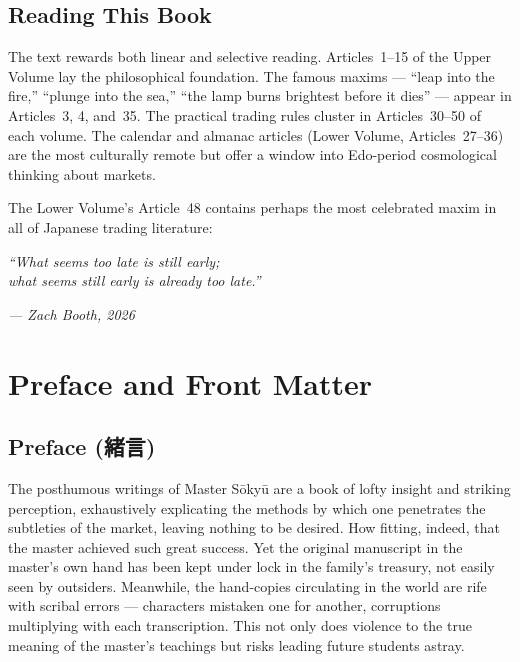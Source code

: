 \documentclass[10pt, openany]{book}
\newcommand{\jp}[1]{{\japanesefont #1}}
\begin{document}
\section*{Reading This Book}

The text rewards both linear and selective reading. Articles~1--15 of
the Upper Volume lay the philosophical foundation. The famous maxims
--- ``leap into the fire,'' ``plunge into the sea,'' ``the lamp burns
brightest before it dies'' --- appear in Articles~3, 4, and~35.
The practical trading rules cluster in Articles~30--50 of each volume.
The calendar and almanac articles (Lower Volume, Articles~27--36) are
the most culturally remote but offer a window into Edo-period
cosmological thinking about markets.

The Lower Volume's Article~48 contains perhaps the most celebrated
maxim in all of Japanese trading literature:

\begin{center}
\textit{``What seems too late is still early;\\
what seems still early is already too late.''}
\end{center}

\vspace{1em}

\begin{flushright}
\textit{--- Zach Booth, 2026}
\end{flushright}

\chapter{Preface and Front Matter}

\section{Preface (\jp{緒言})}

The posthumous writings of Master S\=oky\=u are a book of lofty insight
and striking perception, exhaustively explicating the methods by which
one penetrates the subtleties of the market, leaving nothing to be
desired. How fitting, indeed, that the master achieved such great
success. Yet the original manuscript in the master's own hand has been
kept under lock in the family's treasury, not easily seen by outsiders.
Meanwhile, the hand-copies circulating in the world are rife with
scribal errors --- characters mistaken one for another, corruptions
multiplying with each transcription. This not only does violence to the
true meaning of the master's teachings but risks leading future students
astray.
\end{document}
